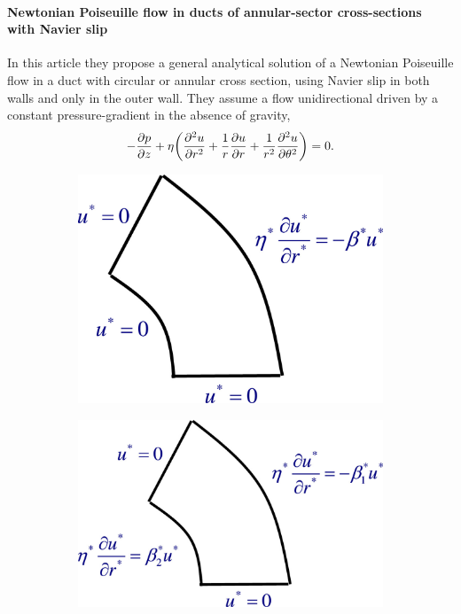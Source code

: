 \documentclass[main.tex]{subfiles}
\begin{document}
\paragraph{Newtonian Poiseuille flow in ducts of annular-sector cross-sections with Navier slip}\cite{kyritsi-yiallourouNewtonianPoiseuilleFlow2018}
In this article they propose a general analytical solution of a Newtonian Poiseuille flow in a duct with circular or annular cross section, using Navier slip in both walls and only in the outer wall.
They assume a flow unidirectional driven by a constant pressure-gradient in the absence of gravity,
\begin{gather*}
	-\pdv{p}{z}+\eta\qty(\pdv[2]{u}{r}+\frac{1}{r}\pdv{u}{r}+\frac{1}{r^2}\pdv[2]{u}{\theta}) = 0.
\end{gather*}
\begin{figure}[ht]
	\begin{subfigure}[c]{0.45\textwidth}
		\centering
		\includegraphics[width=\textwidth]{imgs/newtonPoiseuilleflowinductsofAnnularsectorCrosssectionwithNavierSlipimg1.jpg}
	\end{subfigure}
	\hfill
	\begin{subfigure}[c]{0.45\textwidth}
		\centering
		\includegraphics[width=\textwidth]{imgs/newtonPoiseuilleflowinductsofAnnularsectorCrosssectionwithNavierSlipimg2.jpg}
	\end{subfigure}
\end{figure}
\end{document}
